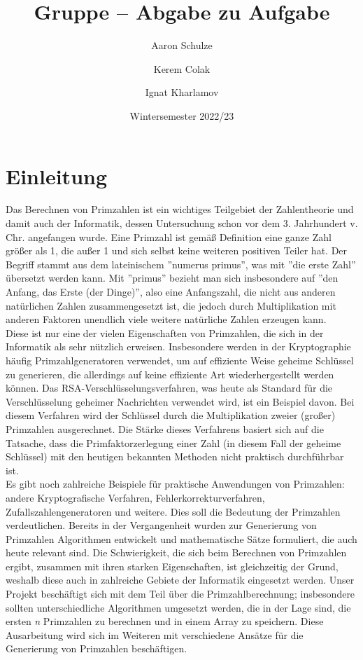 \documentclass[course=erap]{aspdoc}
\author{Aaron Schulze \and Kerem Colak \and Ignat Kharlamov}
\date{Wintersemester 2022/23} %
\title{Gruppe \theGroup{} -- Abgabe zu Aufgabe \theNumber}
\begin{document}
\maketitle

\section{Einleitung}

Das Berechnen von Primzahlen ist ein wichtiges Teilgebiet der Zahlentheorie und damit auch der Informatik, dessen Untersuchung schon vor dem 3. Jahrhundert v. Chr. angefangen wurde. 
Eine Primzahl ist gemäß Definition eine ganze Zahl größer als 1, die außer 1 und sich selbst keine weiteren positiven Teiler hat. \cite{Weitz2018} 
Der Begriff stammt aus dem lateinischem ''numerus primus'', was mit ''die erste Zahl'' übersetzt werden kann. \cite{zenoDictionary} 
Mit ''primus'' bezieht man sich insbesondere auf ''den Anfang, das Erste (der Dinge)'', also eine Anfangszahl, die nicht aus anderen natürlichen Zahlen zusammengesetzt ist, 
die jedoch durch Multiplikation mit anderen Faktoren unendlich viele weitere natürliche Zahlen erzeugen kann.
\\Diese ist nur eine der vielen Eigenschaften von Primzahlen, die sich in der Informatik als sehr nützlich erweisen. Insbesondere werden in der Kryptographie häufig Primzahlgeneratoren verwendet, 
um auf effiziente Weise geheime Schlüssel zu generieren, die allerdings auf keine effiziente Art wiederhergestellt werden können. 
Das RSA-Verschlüsselungsverfahren, was heute als Standard für die Verschlüsselung geheimer Nachrichten verwendet wird, ist ein Beispiel davon. 
Bei diesem Verfahren wird der Schlüssel durch die Multiplikation zweier (großer) Primzahlen ausgerechnet. Die Stärke dieses Verfahrens basiert sich auf die Tatsache, 
dass die Primfaktorzerlegung einer Zahl (in diesem Fall der geheime Schlüssel) mit den heutigen bekannten Methoden nicht praktisch durchführbar ist.\\Es gibt noch zahlreiche Beispiele für praktische Anwendungen von Primzahlen: andere Kryptografische Verfahren, Fehlerkorrekturverfahren, Zufallszahlengeneratoren und weitere.
Dies soll die Bedeutung der Primzahlen verdeutlichen. Bereits in der Vergangenheit wurden zur Generierung von Primzahlen Algorithmen entwickelt 
und mathematische Sätze formuliert, die auch heute relevant sind.
Die Schwierigkeit, die sich beim Berechnen von Primzahlen ergibt, zusammen mit ihren starken Eigenschaften, ist gleichzeitig der Grund, weshalb diese auch in zahlreiche Gebiete 
der Informatik eingesetzt werden. Unser Projekt beschäftigt sich mit dem Teil über die Primzahlberechnung; insbesondere sollten unterschiedliche Algorithmen umgesetzt werden, die in der Lage sind, die ersten \textit{n} Primzahlen zu berechnen und in einem Array zu speichern.
Diese Ausarbeitung wird sich im Weiteren mit verschiedene Ansätze für die Generierung von Primzahlen beschäftigen. 
\end{document}
